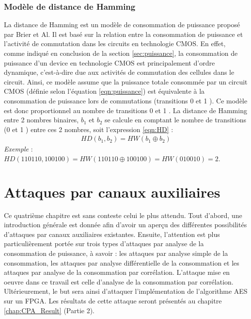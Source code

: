 \documentclass[oneside]{book}
\begin{document}
\subsection{Modèle de distance de Hamming}
\label{sec:modelHD}

La distance de Hamming est un modèle de consommation de puissance proposé par Brier et Al. Il est basé sur la relation entre la consommation de puissance et l'activité de commutation dans les circuits en technologie CMOS. En effet, comme indiqué en conclusion de la section \ref{sec:puissance}, la consommation de puissance d'un device en technologie CMOS est principalement d'ordre dynamique, c'est-à-dire due aux activités de commutation des cellules dans le circuit. Ainsi, ce modèle assume que la puissance totale consommée par un circuit CMOS (définie selon l'équation \ref{eqn:puissance}) est équivalente à la consommation de puissance lors de commutations (transitions 0  et 1 ). Ce modèle est donc proportionnel au nombre de transitions 0  et 1 . La distance de Hamming entre 2 nombres binaires, $b_1$ et $b_2$ se calcule en comptant le nombre de transitions (0  et 1 ) entre ces 2 nombres, soit l'expression \ref{eqn:HD} : 
\begin{gather}
	HD(b_{1},b_{2}) = HW(b_1 \oplus b_2)\label{eqn:HD}
\end{gather}
\textit{Exemple} : $HD(110110,100100) = HW(110110 \oplus 100100) = HW(010010) = 2.$

\newpage


\chapter{Attaques par canaux auxiliaires}
\label{chap:attaques}

Ce quatrième chapitre est sans conteste celui le plus attendu. Tout d'abord, une introduction générale est donnée afin d'avoir un aperçu des différentes possibilités d'attaques par canaux auxiliaires existantes. Ensuite, l'attention est plus particulièrement portée sur trois types d'attaques par analyse de la consommation de puissance, à savoir : les attaques par analyse simple de la consommation, les attaques par analyse différentielle de la consommation et les attaques par analyse de la consommation par corrélation. L'attaque mise en oeuvre dans ce travail est celle d'analyse de la consommation par corrélation. Ultérieurement, le but sera ainsi d'attaquer l'implémentation de l'algorithme AES sur un FPGA. Les résultats de cette attaque seront présentés au chapitre \ref{chap:CPA_Result} (Partie 2). 
\end{document}
